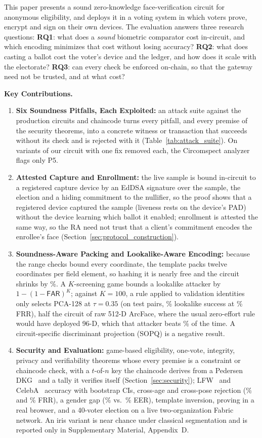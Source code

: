 \documentclass[10pt,letterpaper,journal]{IEEEtran}
\begin{document}
This paper presents a sound zero-knowledge face-verification circuit for anonymous eligibility, and deploys it in a voting system in which voters prove, encrypt and sign on their own devices. The evaluation answers three research questions:
\textbf{RQ1}: what does a \emph{sound} biometric comparator cost in-circuit, and which encoding minimizes that cost without losing accuracy?
\textbf{RQ2}: what does casting a ballot cost the voter's device and the ledger, and how does it scale with the electorate?
\textbf{RQ3}: can every check be enforced on-chain, so that the gateway need not be trusted, and at what cost?

\noindent\textbf{Key Contributions.}
\begin{enumerate}[leftmargin=*,noitemsep,topsep=1pt,parsep=0pt]
    \item \textbf{Six Soundness Pitfalls, Each Exploited:} an attack suite against the production circuits and chaincode turns every pitfall, and every premise of the security theorems, into a concrete witness or transaction that succeeds without its check and is rejected with it (Table~\ref{tab:attack_suite}). On variants of our circuit with one fix removed each, the Circomspect analyzer flags only P5.
    \item \textbf{Attested Capture and Enrollment:} the live sample is bound in-circuit to a registered capture device by an EdDSA signature over the sample, the election and a hiding commitment to the nullifier, so the proof shows that a registered device captured the sample (liveness rests on the device's PAD) without the device learning which ballot it enabled; enrollment is attested the same way, so the RA need not trust that a client's commitment encodes the enrollee's face (Section~\ref{sec:protocol_construction}).
    \item \textbf{Soundness-Aware Packing and Lookalike-Aware Encoding:} because the range checks bound every coordinate, the template packs twelve coordinates per field element, so hashing it is nearly free and the circuit shrinks by \nPackSave\%. A $K$-screening game bounds a lookalike attacker by $1-(1-\mathsf{FAR})^K$; against $K = 100$, a rule applied to validation identities only selects PCA-128 at $\tau = 0.35$ (on test pairs, \nLookLfwHundred\% lookalike success at \nFrr\% FRR), half the circuit of raw 512-D ArcFace, where the usual zero-effort rule would have deployed 96-D, which that attacker beats \nZeLookLfwHundred\% of the time. A circuit-specific discriminant projection (SOPQ) is a negative result.
    \item \textbf{Security and Evaluation:} game-based eligibility, one-vote, integrity, privacy and verifiability theorems whose every premise is a constraint or chaincode check, with a $t$-of-$n$ key the chaincode derives from a Pedersen DKG~\cite{Pedersen1991} and a tally it verifies itself (Section~\ref{sec:security}); LFW~\cite{Huang2007LFW} and CelebA~\cite{Liu2015CelebA} accuracy with bootstrap CIs, cross-age and cross-pose rejection (\nCalfwFrr\% and \nCplfwFrr\% FRR), a gender gap (\nMaleEer\% vs.\ \nFemaleEer\% EER), template inversion, proving in a real browser, and a 40-voter election on a live two-organization Fabric network. An iris variant is near chance under classical segmentation and is reported only in Supplementary Material, Appendix~D.

\end{enumerate}
\end{document}
